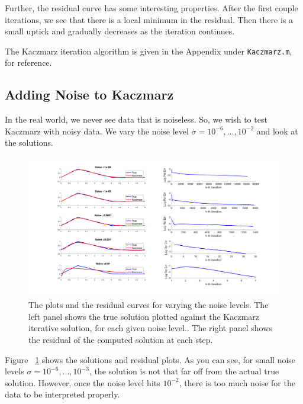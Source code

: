 \documentclass{article}
\begin{document}
Further, the residual curve has some interesting properties. After the first couple iterations, we see that there is a local minimum in the residual. Then there is a small uptick and gradually decreases as the iteration continues.

The Kaczmarz iteration algorithm is given in the Appendix under \texttt{Kaczmarz.m}, for reference.

\subsection{Adding Noise to Kaczmarz}

In the real world, we never see data that is noiseless. So, we wish to test Kaczmarz with noisy data. We vary the noise level $\sigma = 10^{-6},...,10^{-2}$ and look at the solutions.

\begin{figure}[H]
    \centerline{
    \includegraphics[height = 13 cm]{Iteration.png}
    }
    \caption{\label{fig:Iteration} The plots and the residual curves for varying the noise levels. The left panel shows the true solution plotted against the Kaczmarz iterative solution, for each given noise level.. The right panel shows the residual of the computed solution at each step.}
\end{figure}


Figure ~\ref{fig:Iteration} shows the solutions and residual plots. As you can see, for small noise levels $\sigma = 10^{-6},...,10^{-3}$, the solution is not that far off from the actual true solution. However, once the noise level hits $10^{-2}$, there is too much noise for the data to be interpreted properly.
\end{document}
